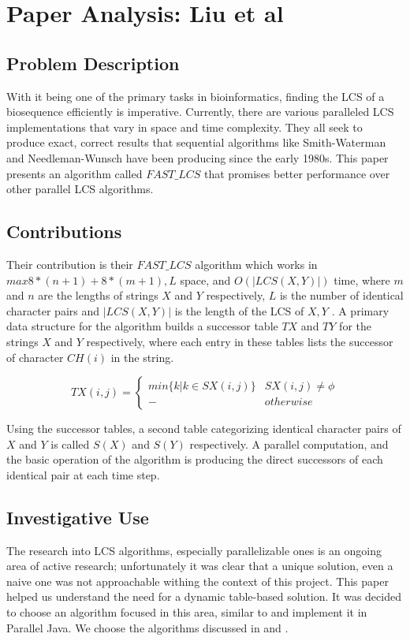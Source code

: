 \section{Paper Analysis: Liu et al }

\subsection{Problem Description}
With it being one of the primary tasks in bioinformatics, finding the LCS of a biosequence efficiently is imperative. Currently, there are various paralleled LCS implementations that vary in space and time complexity. They all seek to produce exact, correct results that sequential algorithms like Smith-Waterman and Needleman-Wunsch have been producing since the early 1980s. This paper presents an algorithm called $FAST\_LCS$ that promises better performance over other parallel LCS algorithms.


\subsection{Contributions}
Their contribution is their $FAST\_LCS$ algorithm which works in \\ $max{8*(n+1)+8*(m+1),L}$ space, and $O(|LCS(X,Y)|)$ time, where  $m$ and $n$ are the lengths of strings $X$ and $Y$ respectively, $L$ is the number of identical character pairs and $|LCS(X,Y)|$ is the length of the LCS of $X,Y$ \cite{Liu:2007p402}. A primary data structure for the algorithm builds a successor table $TX$ and $TY$ for the strings $X$ and $Y$ respectively, where each entry in these tables lists the successor of character $CH(i)$ in the string.

\begin{displaymath}
	TX(i,j)=\left\{
	\begin{array}{cl}
		min\{k|k \in SX(i,j)\} & SX(i,j) \neq \phi \\ 
		- 					 & otherwise
	\end{array}
	\right.
\end{displaymath}

\cite{Liu:2007p402}

Using the successor tables, a second table categorizing identical character pairs of $X$ and $Y$ is called $S(X)$ and $S(Y)$ respectively. A parallel computation, and the basic operation of the algorithm is producing the direct successors of each identical pair at each time step.


\subsection{Investigative Use}
The research into LCS algorithms, especially parallelizable ones is an ongoing area of active research; unfortunately it was clear that a unique solution, even a naive one was not approachable withing the context of this project. This paper helped us understand the need for a dynamic table-based solution. It was decided to choose an algorithm focused in this area, similar to \cite{Liu:2007p402} and implement it in Parallel Java. We choose the algorithms discussed in \cite{Boukerche:2007p1627} and \cite{springerlink:10.10071142718640}.


